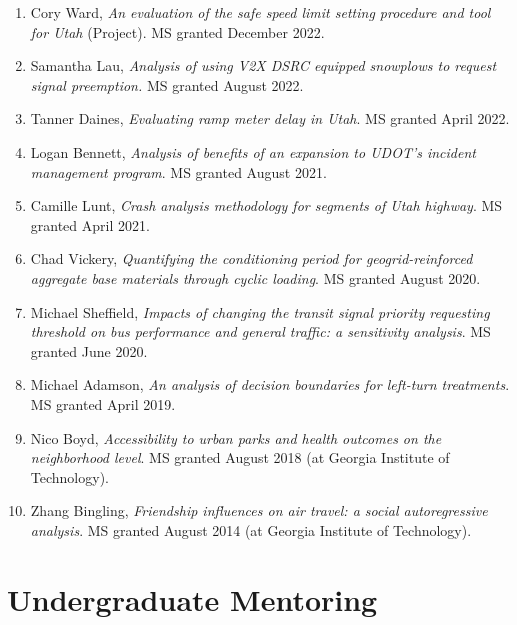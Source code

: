 \documentclass[margin,line]{res}
\newcounter{enuminitialize}
\newenvironment{myenum}[1][]
{%
 \setcounter{enuminitialize}{#1}
 \addtocounter{enuminitialize}{2}
 \begin{enumerate}[left= 4pt, itemsep=8pt, start=\value{enuminitialize}, label=\arabic*\addtocounter{enumi}{-2}]
}
{%
 \end{enumerate}
}
\begin{document}
\begin{resume}
\begin{myenum}[24]
  \item Cory Ward, \textit{An evaluation of the safe speed limit setting procedure and tool for Utah} (Project). MS granted December 2022.
  \item Samantha Lau, \textit{Analysis of using V2X DSRC equipped snowplows to request signal preemption.} MS granted August 2022.
  \item Tanner Daines, \textit{Evaluating ramp meter delay in Utah}. MS granted April 2022.
  \item Logan Bennett, \textit{Analysis of benefits of an expansion to UDOT’s incident management program}. MS granted August 2021.
  \item Camille Lunt, \textit{Crash analysis methodology for segments of Utah highway}. MS granted April 2021.
  \item Chad Vickery, \textit{Quantifying the conditioning period for geogrid-reinforced aggregate base materials through cyclic loading}. MS granted August 2020.
  \item Michael Sheffield, \textit{Impacts of changing the transit signal priority requesting threshold on bus performance and general traffic: a sensitivity analysis}. MS granted June 2020.
  \item Michael Adamson, \textit{An analysis of decision boundaries for left-turn treatments}. MS granted April 2019.
  \item Nico Boyd, \textit{Accessibility to urban parks and health outcomes on the neighborhood level}. MS granted August 2018 (at Georgia Institute of Technology).
  \item Zhang Bingling, \textit{Friendship influences on air travel: a social autoregressive analysis}. MS granted August 2014 (at Georgia Institute of Technology).
\end{myenum}


\section{Undergraduate Mentoring}


\end{resume}
\end{document}
